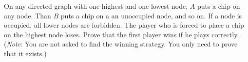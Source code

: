 On any directed graph with one highest and one lowest node, $A$ puts a chip on any node. Than $B$ puts a chip on a an unoccupied node, and so on. If a node is occupied, all lower nodes are forbidden. The player who is forced to place a chip on the highest node loses. Prove that the first player wins if he plays correctly. (\emph{Note}: You are not asked to find the winning strategy. You only need to prove that it exists.)
